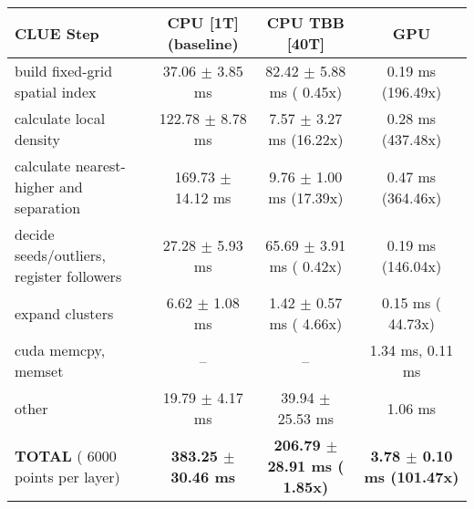     \begin{tabular}{l|c|c|c}
    \hline
    CLUE Step                                 & CPU [1T] (baseline)         & CPU TBB [40T]                         & GPU                       \\ \hline
    build fixed-grid spatial index            &  37.06 $\pm$  3.85 ms       &  82.42 $\pm$  5.88 ms ( 0.45x)        &   0.19 ms (196.49x)       \\
    calculate local density                   & 122.78 $\pm$  8.78 ms       &   7.57 $\pm$  3.27 ms (16.22x)        &   0.28 ms (437.48x)       \\
    calculate nearest-higher and separation   & 169.73 $\pm$ 14.12 ms       &   9.76 $\pm$  1.00 ms (17.39x)        &   0.47 ms (364.46x)       \\
    decide seeds/outliers, register followers &  27.28 $\pm$  5.93 ms       &  65.69 $\pm$  3.91 ms ( 0.42x)        &   0.19 ms (146.04x)       \\
    expand clusters                           &   6.62 $\pm$  1.08 ms       &   1.42 $\pm$  0.57 ms ( 4.66x)        &   0.15 ms ( 44.73x)       \\ \hline
    cuda memcpy, memset                       & --                          & --                                    &   1.34 ms,   0.11 ms      \\ 
    other                                     &  19.79 $\pm$  4.17 ms       &  39.94 $\pm$ 25.53 ms                 &   1.06 ms                 \\ \hline
    \textbf{TOTAL} ( 6000 points per layer)   & \textbf{383.25 $\pm$ 30.46 ms} & \textbf{206.79 $\pm$ 28.91 ms ( 1.85x)} & \textbf{  3.78 $\pm$  0.10 ms (101.47x)}  \\
    \hline 
    \end{tabular}
    \linebreak


